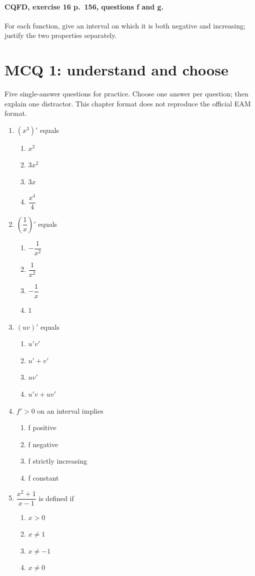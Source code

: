 \paragraph{CQFD, exercise 16 p.~156, questions f and g.}\label{C06-M2} For each function, give an interval on which it is both negative and increasing; justify the two properties separately.
\begingroup\small
\clearpage\section*{MCQ 1: understand and choose}\label{C06-Q1}
Five single-answer questions for practice. Choose one answer per question; then explain one distractor. This chapter format does not reproduce the official EAM format.
\begin{enumerate}
\item $(x^3)\prime$ equals
\begin{enumerate}[label=\Alph*.,itemsep=2pt]
\item $x^2$
\item $3x^2$
\item $3x$
\item $\dfrac{x^4}{4}$
\end{enumerate}
\item $(\dfrac{1}{x})\prime $ equals
\begin{enumerate}[label=\Alph*.,itemsep=2pt]
\item $-\dfrac{1}{x^2}$
\item $\dfrac{1}{x^2}$
\item $-\dfrac{1}{x}$
\item $1$
\end{enumerate}
\item $(uv)\prime$ equals
\begin{enumerate}[label=\Alph*.,itemsep=2pt]
\item $u\prime v\prime$
\item $u\prime+v\prime$
\item $uv\prime$
\item $u\prime v+uv\prime$
\end{enumerate}
\item $f\prime>0$ on an interval implies
\begin{enumerate}[label=\Alph*.,itemsep=2pt]
\item f positive
\item f negative
\item f strictly increasing
\item f constant
\end{enumerate}
\item $\dfrac{x^2+1}{x-1}$ is defined if
\begin{enumerate}[label=\Alph*.,itemsep=2pt]
\item $x>0$
\item $x\ne1$
\item $x\ne-1$
\item $x\ne0$
\end{enumerate}
\end{enumerate}
